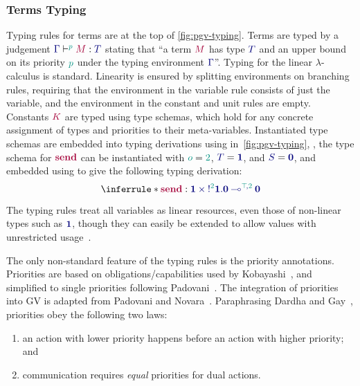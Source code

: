 \subsubsection*{Terms Typing}
Typing rules for terms are at the top of \cref{fig:pgv-typing}.
Terms are typed by a judgement $\tseq[\cs{p}]{\ty{\Gamma}}{M}{T}$ stating that ``a term $\tm{M}$ has type $\ty{T}$ and an upper bound on its priority $\cs{p}$ under the typing environment $\ty{\Gamma}$''. Typing for the linear $\lambda$-calculus is standard. Linearity is ensured by splitting environments on branching rules, requiring that the environment in the variable rule consists of just the variable, and the environment in the constant and unit rules are empty. Constants $\tm{K}$ are typed using type schemas, which hold for any concrete assignment of types and priorities to their meta-variables. Instantiated type schemas are embedded into typing derivations using  in~\cref{fig:pgv-typing}, \eg, the type schema for $\tm{\send}$ can be instantiated with $\cs{o}=\cs{2}$, $\ty{T}=\ty{\tyunit}$, and $\ty{S}=\ty{\tyvoid}$, and embedded using  to give the following typing derivation:
\[
  \inferrule*{
  }{\tmty{\send}{\tylolli[\cs{\ptop},\cs{2}]{\typrod{\tyunit}{\tysend[\cs{2}]{\tyunit}{\tyvoid}}}{\tyvoid}}}
\]

The typing rules treat {all variables} as linear resources, even those of non-linear types such as $\ty{\tyunit}$, though they can easily be extended to allow values with unrestricted usage~\cite{wadler14}.

The only non-standard feature of the typing rules is the priority annotations. Priorities are based on {obligations/capabilities} used by Kobayashi~\cite{kobayashi06}, and simplified to single priorities following Padovani~\cite{padovani14}. The integration of priorities into GV is adapted from Padovani and Novara~\cite{padovaninovara15}. Paraphrasing Dardha and Gay~\cite{dardhagay18extended}, priorities obey the following two laws:
\begin{enumerate}[label= (\roman*) ]
  \item an action with lower priority happens before an action with higher priority; and
  \item communication requires \emph{equal} priorities for dual actions.
\end{enumerate}

